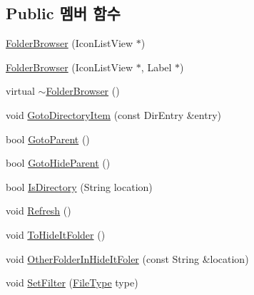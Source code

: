 \subsection*{Public 멤버 함수}
\begin{DoxyCompactItemize}
\item 
\hyperlink{class_folder_browser_ab65db5bef6751cd9ee0cf2969641af73}{Folder\+Browser} (Icon\+List\+View $\ast$)
\item 
\hyperlink{class_folder_browser_a0985d66e183cf2e78f4ead00eaef2fa7}{Folder\+Browser} (Icon\+List\+View $\ast$, Label $\ast$)
\item 
virtual \hyperlink{class_folder_browser_a389c509af1dd5ee9b31caed45ce8dce4}{$\sim$\+Folder\+Browser} ()
\item 
void \hyperlink{class_folder_browser_ae5aef032f95d4d1ef70ed3bfdb74344a}{Goto\+Directory\+Item} (const Dir\+Entry \&entry)
\item 
bool \hyperlink{class_folder_browser_a696779b24f262b38abc391da85d6da37}{Goto\+Parent} ()
\item 
bool \hyperlink{class_folder_browser_a0b3f244916ce95cecf88adcf07a533fa}{Goto\+Hide\+Parent} ()
\item 
bool \hyperlink{class_folder_browser_a982d11b6ccc3b5d9d53c4257583f9852}{Is\+Directory} (String location)
\item 
void \hyperlink{class_folder_browser_a04d5bb9d0275ab67d6cc3b8d268b1b12}{Refresh} ()
\item 
void \hyperlink{class_folder_browser_ab462a9486e5fc26ad711bbc261748462}{To\+Hide\+It\+Folder} ()
\item 
void \hyperlink{class_folder_browser_a9650b4b7549fab9669d6510118cf9964}{Other\+Folder\+In\+Hide\+It\+Foler} (const String \&location)
\item 
void \hyperlink{class_folder_browser_a6d543b0062fbb2b1d5de68346fcce7a5}{Set\+Filter} (\hyperlink{_folder_browser_8h_a0fab6cfad193ba9c1d78c6bb69c9426f}{File\+Type} type)
\end{DoxyCompactItemize}
